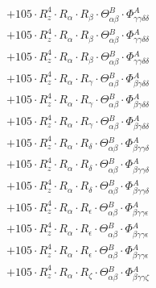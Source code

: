 \documentclass{article}
\begin{document}
\begin{subequations}
\begin{gather}
\begin{array}{c}
 \\[0.2em] 		 + 105 \cdot R_{z}^{4} \cdot R_{\alpha{}} \cdot R_{\beta{}} \cdot \Theta{}^{B}_{\alpha{}\beta{}} \cdot \Phi{}^{A}_{\gamma{}\gamma{}\delta{}\delta{}} 
 \\[0.2em] 		 + 105 \cdot R_{z}^{4} \cdot R_{\alpha{}} \cdot R_{\beta{}} \cdot \Theta{}^{B}_{\alpha{}\beta{}} \cdot \Phi{}^{A}_{\gamma{}\gamma{}\delta{}\delta{}} 
 \\[0.2em] 		 + 105 \cdot R_{z}^{4} \cdot R_{\alpha{}} \cdot R_{\beta{}} \cdot \Theta{}^{B}_{\alpha{}\beta{}} \cdot \Phi{}^{A}_{\gamma{}\gamma{}\delta{}\delta{}} 
 \\[0.2em] 		 + 105 \cdot R_{z}^{4} \cdot R_{\alpha{}} \cdot R_{\gamma{}} \cdot \Theta{}^{B}_{\alpha{}\beta{}} \cdot \Phi{}^{A}_{\beta{}\gamma{}\delta{}\delta{}} 
 \\[0.2em] 		 + 105 \cdot R_{z}^{4} \cdot R_{\alpha{}} \cdot R_{\gamma{}} \cdot \Theta{}^{B}_{\alpha{}\beta{}} \cdot \Phi{}^{A}_{\beta{}\gamma{}\delta{}\delta{}} 
 \\[0.2em] 		 + 105 \cdot R_{z}^{4} \cdot R_{\alpha{}} \cdot R_{\gamma{}} \cdot \Theta{}^{B}_{\alpha{}\beta{}} \cdot \Phi{}^{A}_{\beta{}\gamma{}\delta{}\delta{}} 
 \\[0.2em] 		 + 105 \cdot R_{z}^{4} \cdot R_{\alpha{}} \cdot R_{\delta{}} \cdot \Theta{}^{B}_{\alpha{}\beta{}} \cdot \Phi{}^{A}_{\beta{}\gamma{}\gamma{}\delta{}} 
 \\[0.2em] 		 + 105 \cdot R_{z}^{4} \cdot R_{\alpha{}} \cdot R_{\delta{}} \cdot \Theta{}^{B}_{\alpha{}\beta{}} \cdot \Phi{}^{A}_{\beta{}\gamma{}\gamma{}\delta{}} 
 \\[0.2em] 		 + 105 \cdot R_{z}^{4} \cdot R_{\alpha{}} \cdot R_{\delta{}} \cdot \Theta{}^{B}_{\alpha{}\beta{}} \cdot \Phi{}^{A}_{\beta{}\gamma{}\gamma{}\delta{}} 
 \\[0.2em] 		 + 105 \cdot R_{z}^{4} \cdot R_{\alpha{}} \cdot R_{\epsilon{}} \cdot \Theta{}^{B}_{\alpha{}\beta{}} \cdot \Phi{}^{A}_{\beta{}\gamma{}\gamma{}\epsilon{}} 
 \\[0.2em] 		 + 105 \cdot R_{z}^{4} \cdot R_{\alpha{}} \cdot R_{\epsilon{}} \cdot \Theta{}^{B}_{\alpha{}\beta{}} \cdot \Phi{}^{A}_{\beta{}\gamma{}\gamma{}\epsilon{}} 
 \\[0.2em] 		 + 105 \cdot R_{z}^{4} \cdot R_{\alpha{}} \cdot R_{\epsilon{}} \cdot \Theta{}^{B}_{\alpha{}\beta{}} \cdot \Phi{}^{A}_{\beta{}\gamma{}\gamma{}\epsilon{}} 
 \\[0.2em] 		 + 105 \cdot R_{z}^{4} \cdot R_{\alpha{}} \cdot R_{\zeta{}} \cdot \Theta{}^{B}_{\alpha{}\beta{}} \cdot \Phi{}^{A}_{\beta{}\gamma{}\gamma{}\zeta{}} 

\end{array}
\end{gather}
\end{subequations}
\end{document}
